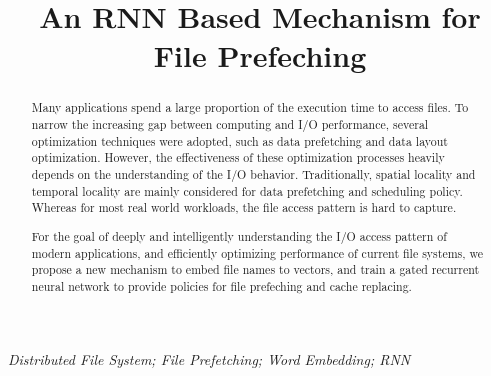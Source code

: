 \documentclass[conference]{IEEEtran}
\begin{document}
\title{An RNN Based Mechanism for File Prefeching\\
}

\author{
\and
{}
}

\maketitle

\begin{abstract}
    Many applications spend a large proportion of the execution time to access files.
    To narrow the increasing gap between computing and I/O performance, several optimization techniques were adopted, 
    such as data prefetching and data layout optimization. However, the effectiveness of these optimization processes heavily 
    depends on the understanding of the I/O behavior. Traditionally, spatial locality and temporal locality
    are mainly considered for data prefetching and scheduling policy. Whereas for most real world workloads, the file access pattern 
    is hard to capture. 

    For the goal of deeply and intelligently understanding the I/O access pattern of modern applications, and efficiently optimizing performance of current file systems,
    we propose a new mechanism to embed file names to vectors, and train a gated recurrent neural network to provide policies for file prefeching and cache replacing.
\end{abstract}

\begin{IEEEkeywords}
    \textit{Distributed File System; File Prefetching; Word Embedding; RNN}

\end{IEEEkeywords}
\end{document}
